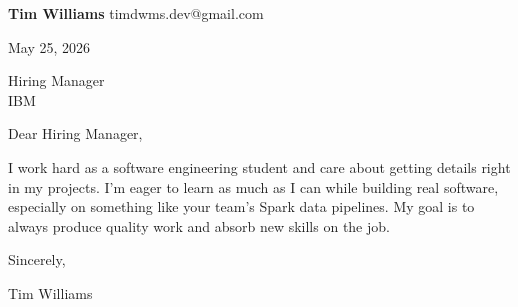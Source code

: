 \documentclass[12pt]{article}
\begin{document}
\textbf{Tim Williams} \hfill timdwms.dev@gmail.com

\vspace{1em}

May 25, 2026

\vspace{1em}

Hiring Manager \\
IBM

\vspace{1em}

Dear Hiring Manager,

I work hard as a software engineering student and care about getting details right in my projects. I'm eager to learn as much as I can while building real software, especially on something like your team's Spark data pipelines. My goal is to always produce quality work and absorb new skills on the job.

\vspace{1em}

Sincerely,

\vspace{2em}

Tim Williams
\end{document}
